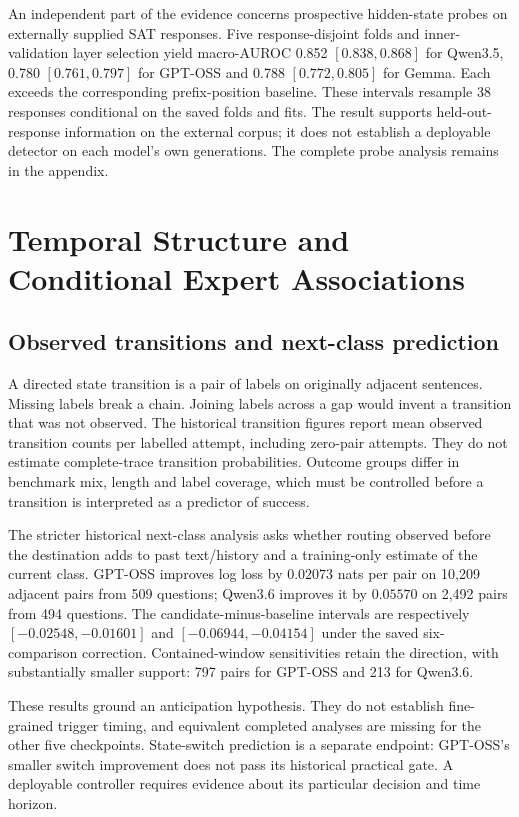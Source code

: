 An independent part of the evidence concerns prospective hidden-state
probes on externally supplied SAT responses. Five response-disjoint folds
and inner-validation layer selection yield macro-AUROC 0.852
$[0.838,0.868]$ for Qwen3.5, 0.780 $[0.761,0.797]$ for GPT-OSS and 0.788
$[0.772,0.805]$ for Gemma. Each exceeds the corresponding prefix-position
baseline. These intervals resample 38 responses conditional on the saved
folds and fits. The result supports held-out-response information on the
external corpus; it does not establish a deployable detector on each
model's own generations. The complete probe analysis remains in the
appendix.

\section{Temporal Structure and Conditional Expert Associations}
\label{sec:temporal-experts}

\subsection{Observed transitions and next-class prediction}
A directed state transition is a pair of labels on originally adjacent
sentences. Missing labels break a chain. Joining labels across a gap would
invent a transition that was not observed. The historical transition
figures report mean observed transition counts per labelled attempt,
including zero-pair attempts. They do not estimate complete-trace
transition probabilities. Outcome groups differ in benchmark mix, length
and label coverage, which must be controlled before a transition is
interpreted as a predictor of success.

The stricter historical next-class analysis asks whether routing observed
before the destination adds to past text/history and a training-only
estimate of the current class. GPT-OSS improves log loss by $0.02073$
nats per pair on 10,209 adjacent pairs from 509 questions; Qwen3.6 improves
it by $0.05570$ on 2,492 pairs from 494 questions. The candidate-minus-baseline
intervals are respectively $[-0.02548,-0.01601]$ and
$[-0.06944,-0.04154]$ under the saved six-comparison correction.
Contained-window sensitivities retain the direction, with substantially
smaller support: 797 pairs for GPT-OSS and 213 for Qwen3.6.

These results ground an anticipation hypothesis. They do not establish
fine-grained trigger timing, and equivalent completed analyses are missing
for the other five checkpoints. State-switch prediction is a separate
endpoint: GPT-OSS's smaller switch improvement does not pass its historical
practical gate. A deployable controller requires evidence about its
particular decision and time horizon.

